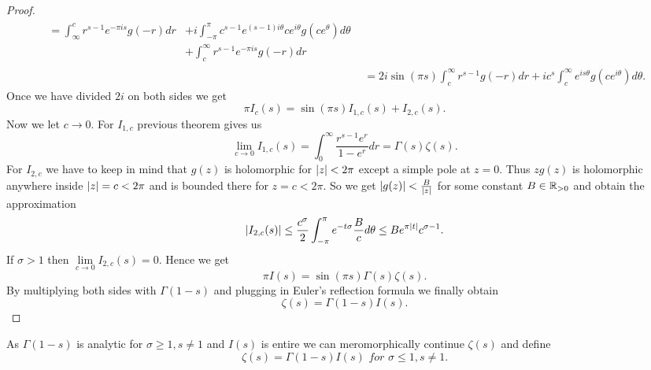 \begin{proof}
\begin{equation*}
\begin{aligned}
\begin{aligned}
		= \int _\infty ^c r^{s - 1} e^{-\pi i s} g(-r) dr
		&+ i \int _{-\pi} ^{\pi} c^{s - 1} e^{(s - 1) i \theta} c e^{i \theta} g(c e^\theta) d\theta \\ 
		&+ \int _{c} ^\infty r^{s - 1} e^{-\pi i s} g(-r) dr
	\end{aligned} \\
	&= 2 i \sin(\pi s) \int _c ^\infty r^{s - 1} g(-r) dr + i c^s \int _c ^\infty e^{i s \theta} g(c e^{i \theta}) d\theta.
\end{aligned}
\end{equation*}
	Once we have divided $2i$ on both sides we get
\begin{equation*}
	\pi I_c(s) = \sin(\pi s)I_{1, c}(s) + I_{2, c}(s).
\end{equation*}
	Now we let $c \to 0$. For $I_{1, c}$ previous theorem gives us
\begin{equation*}
	\lim\limits _{c \to 0} I_{1, c}(s) = \int _0 ^\infty \frac{r^{s - 1} e^r}{1 - e^r} dr = \Gamma(s)\zeta(s).
\end{equation*}
	For $I_{2, c}$ we have to keep in mind that $g(z)$ is holomorphic for $\left|z\right| < 2 \pi$ except a simple pole at $z = 0$. Thus $z g(z)$ is holomorphic anywhere inside $\left|z\right| = c < 2 \pi$ and is bounded there for $z = c < 2 \pi$. So we get $\left|g(z)\right| < \frac{B}{\left|z\right|}$ for some constant $B \in \mathbb{R}_{> 0}$ and obtain the approximation
\begin{equation*}
	\left|I_{2, c}(s)\right| \leq \frac{c^\sigma}{2} \int _{-\pi} ^{\pi} e^{-t \sigma} \frac{B}{c} d\theta \leq B e^{\pi \left|t\right|} c^{\sigma - 1}.
\end{equation*}
	If $\sigma > 1$ then $\lim\limits _{c \to 0} I_{2, c}(s) = 0$. Hence we get
\begin{equation*}
	\pi I(s) = \sin(\pi s) \Gamma(s)\zeta(s).
\end{equation*}
	By multiplying both sides with $\Gamma(1 - s)$ and plugging in Euler's reflection formula we finally obtain
\begin{equation*}
	\zeta(s) = \Gamma(1 - s) I(s).
\end{equation*}
\end{proof}


\begin{definition}
	As $\Gamma(1 - s)$ is analytic for $\sigma \geq 1, s \neq 1$ and $I(s)$ is entire we can meromorphically continue $\zeta(s)$ and define 
\begin{equation*}
	\zeta(s) = \Gamma(1 - s) I(s) \textit{ for } \sigma \leq 1, s \neq 1.
\end{equation*}
\end{definition}


